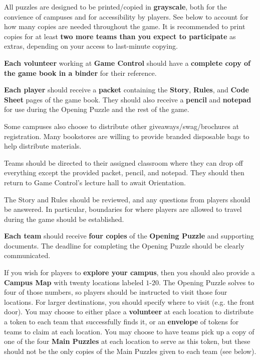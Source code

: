 
All puzzles are designed to be printed/copied in \textbf{grayscale}, both
for the convience of campuses and for accessibility by players.
See below to account for how many copies are needed throughout the game.
It is recommended to print copies for at least
\textbf{two more teams than you expect to participate} as extras, depending
on your access to last-minute copying.

\textbf{Each volunteer} working at \textbf{Game Control} should have a
\textbf{complete copy of the game book in a binder} for their reference.


\textbf{Each player} should receive a \textbf{packet} containing the
\textbf{Story}, \textbf{Rules}, and \textbf{Code Sheet} pages of the game book.
They should also receive
a \textbf{pencil} and \textbf{notepad} for use during the Opening Puzzle
and the rest of the game.

Some campuses also choose to distribute other giveaways/swag/brochures
at registration. Many bookstores are willing to provide branded disposable
bags to help distribute materials.

Teams should be directed to their assigned classroom where they can
drop off everything except the provided packet, pencil, and notepad.
They should then return to Game Control's lecture hall to await Orientation.


The Story and Rules should be reviewed, and any questions from players
should be answered. In particular, boundaries for where players are allowed
to travel during the game should be established.


\textbf{Each team} should receive \textbf{four copies} of the
\textbf{Opening Puzzle} and supporting documents. The deadline for
completing the Opening Puzzle should be clearly communicated.

If you wish for players to \textbf{explore your campus}, then you should
also provide a \textbf{Campus Map} with twenty locations labeled \(1\)-\(20\).
The Opening Puzzle solves to four of those numbers, so players should be
instructed to visit those four locations. For larger destinations, you should
specify where to visit (e.g. the front door). You may choose to either place
a \textbf{volunteer} at each location to distribute a token to each team that
successfully finds it, or an \textbf{envelope} of tokens for teams to claim at
each location. You may choose to have teams pick up a copy of one of the four
\textbf{Main Puzzles} at each location to serve as this token, but these should
not be the only copies of the Main Puzzles given to each team (see below).

